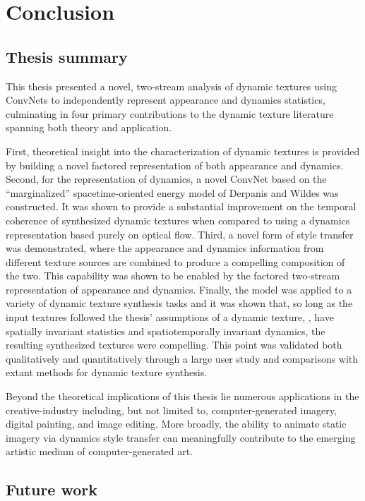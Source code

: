 \chapter{Conclusion}

\section{Thesis summary}\label{sec:thesis_summary}

This thesis presented a novel, two-stream analysis
of dynamic textures using ConvNets to independently represent appearance and
dynamics statistics, culminating in four primary contributions to the dynamic texture literature spanning both theory and application.

First, theoretical insight into the characterization of dynamic textures is provided by building a novel factored representation of both appearance and dynamics. Second, for the representation of dynamics, a novel ConvNet based on the ``marginalized'' spacetime-oriented energy model of Derpanis and Wildes \cite{derpanis2012spacetime} was constructed. It was shown to provide a substantial improvement on the temporal coherence of synthesized dynamic textures when compared to using a dynamics representation based purely on optical flow. Third, a novel form of style transfer was demonstrated, where the appearance and dynamics information from different texture sources are combined to produce a compelling composition of the two. This capability was shown to be enabled by the factored two-stream representation of appearance and dynamics. Finally, the model was applied to a variety of dynamic texture synthesis tasks and it was shown that, so long as the input textures followed the thesis' assumptions of a dynamic texture, \ie, have spatially invariant statistics and spatiotemporally invariant dynamics, the resulting synthesized textures were compelling. This point was validated both qualitatively and quantitatively through a large user study and comparisons with extant methods for dynamic texture synthesis.

Beyond the theoretical implications of this thesis lie numerous applications in the creative-industry including, but not limited to, computer-generated imagery, digital painting, and image editing. More broadly, the ability 
to animate static imagery via dynamics style transfer can meaningfully contribute 
to the emerging artistic medium of computer-generated art.

\section{Future work}\label{sec:future_work}

